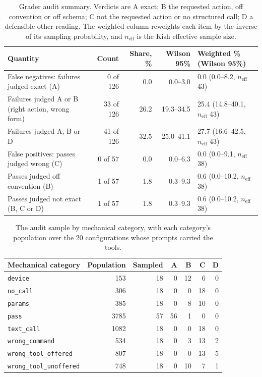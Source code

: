 \documentclass[11pt]{article}
\begin{document}
\begin{table}[tbp]
\centering
\caption{Grader audit summary. Verdicts are A exact; B the requested action, off convention or off schema; C not the requested action or no structured call; D a defensible other reading. The weighted column reweights each item by the inverse of its sampling probability, and $n_\mathrm{eff}$ is the Kish effective sample size.}
\label{tab:audit}
\small
\begin{tabularx}{\linewidth}{@{}Lrrrl@{}}
\toprule
Quantity & Count & Share, \% & Wilson 95\% & Weighted \% (Wilson 95\%) \\
\midrule
False negatives: failures judged exact (A) & 0 of 126 & 0.0 & 0.0--3.0 & 0.0 (0.0--8.2, $n_\mathrm{eff}$ 43) \\
Failures judged A or B (right action, wrong form) & 33 of 126 & 26.2 & 19.3--34.5 & 25.4 (14.8--40.1, $n_\mathrm{eff}$ 43) \\
Failures judged A, B or D & 41 of 126 & 32.5 & 25.0--41.1 & 27.7 (16.6--42.5, $n_\mathrm{eff}$ 43) \\
False positives: passes judged wrong (C) & 0 of 57 & 0.0 & 0.0--6.3 & 0.0 (0.0--9.1, $n_\mathrm{eff}$ 38) \\
Passes judged off convention (B) & 1 of 57 & 1.8 & 0.3--9.3 & 0.6 (0.0--10.2, $n_\mathrm{eff}$ 38) \\
Passes judged not exact (B, C or D) & 1 of 57 & 1.8 & 0.3--9.3 & 0.6 (0.0--10.2, $n_\mathrm{eff}$ 38) \\
\bottomrule
\end{tabularx}
\end{table}

\begin{table}[tbp]
\centering
\caption{The audit sample by mechanical category, with each category's population over the 20 configurations whose prompts carried the tools.}
\label{tab:auditcat}
\small
\begin{tabular}{@{}lrrrrrr@{}}
\toprule
Mechanical category & Population & Sampled & A & B & C & D \\
\midrule
\texttt{device} & 153 & 18 & 0 & 12 & 6 & 0 \\
\texttt{no\_call} & 306 & 18 & 0 & 0 & 18 & 0 \\
\texttt{params} & 385 & 18 & 0 & 8 & 10 & 0 \\
\texttt{pass} & 3785 & 57 & 56 & 1 & 0 & 0 \\
\texttt{text\_call} & 1082 & 18 & 0 & 0 & 18 & 0 \\
\texttt{wrong\_command} & 534 & 18 & 0 & 3 & 13 & 2 \\
\texttt{wrong\_tool\_offered} & 807 & 18 & 0 & 0 & 13 & 5 \\
\texttt{wrong\_tool\_unoffered} & 748 & 18 & 0 & 10 & 7 & 1 \\
\bottomrule
\end{tabular}
\end{table}
\end{document}
